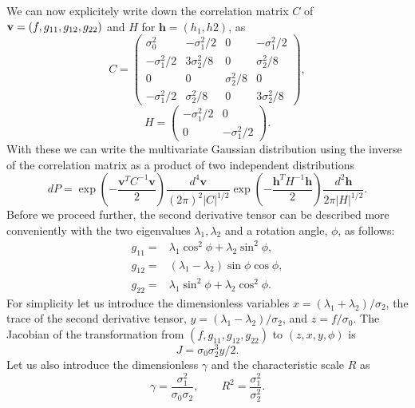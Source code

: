 \documentclass[twocolumn]{emulateapj}
\newcommand{\hh}{\mathbf{h}}
\newcommand{\vv}{\mathbf{v}}
\begin{document}
We can now explicitely write down the correlation matrix $C$ of 
${\bf v} = (f,g_{11},g_{12},g_{22})$ and $H$ for $\hh= (h_1, h2)$, as
\begin{equation}
	 C = \left(
		\begin{array}{cccc}
			\sigma_0^2 & -\sigma_1^2/2 & 0 & -\sigma_1^2/2\\
			-\sigma_1^2/2 & 3\sigma_2^2/8 & 0 & \sigma_2^2/8\\
			  0 & 0 & \sigma_2^2/8  & 0\\
			-\sigma_1^2/2 & \sigma_2^2/8 & 0 & 3\sigma_2^2/8
		 \end{array}\right),
\end{equation}
\begin{equation}
	 H = \left(
		\begin{array}{cccc}
			-\sigma_1^2/2 & 0 \\
			0 & -\sigma_1^2/2
		 \end{array}\right).
\end{equation}
With these we can write the multivariate Gaussian distribution using the inverse 
of the correlation matrix as a product of two independent distributions
\begin{equation}
	dP =\exp\left(-\frac{\vv^T C^{-1}\vv}{2}\right)
  			\frac{d^4 \vv} {(2\pi)^2|C|^{1/2}}
		 \exp\left(-\frac{\hh^T H^{-1} \hh}{2}\right) 
			\frac{d^2 \hh} {2\pi|H|^{1/2}}.
\end{equation}
Before we proceed further, the second derivative tensor can be described more conveniently
with the two eigenvalues $\lambda_1,\lambda_2$ and a rotation angle,
$\phi$, as follows:
\begin{eqnarray}
	g_{11} =& \lambda_1 \cos^2\phi +\lambda_2 \sin^2\phi,\\
	g_{12} =& (\lambda_1-\lambda_2) \sin\phi \cos\phi,\\
	g_{22} =& \lambda_1 \sin^2\phi + \lambda_2 \cos^2\phi.
\end{eqnarray}
For simplicity let us introduce the dimensionless variables 
$x=(\lambda_1+\lambda_2)/\sigma_2$, the trace of the second derivative tensor, 
$y=(\lambda_1-\lambda_2)/\sigma_2$, and $z = f/\sigma_0$. The Jacobian of the 
transformation from $(f,g_{11},g_{12},g_{22})$ to $(z,x,y,\phi)$ is
\begin{equation}
		J = \sigma_0\sigma_2^3 y/2.  
\end{equation} 
Let us also introduce the dimensionless $\gamma$ and the characteristic scale 
$R$ as
\begin{equation}
	\gamma = \frac{\sigma_1^2}{\sigma_0\sigma_2},
		\qquad R^2 = \frac{\sigma_1^2}{\sigma_2^2}.
\end{equation}
\end{document}
